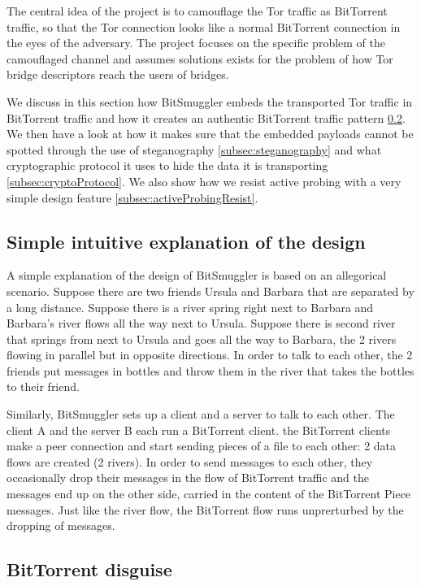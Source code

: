 \documentclass[11pt]{article} %
\newcommand{\projectName}{BitSmuggler }
\begin{document}
The central idea of the project is to camouflage the Tor traffic as BitTorrent traffic, so that the Tor connection looks like a normal BitTorrent connection in the eyes of the adversary. The project focuses on the specific problem of the camouflaged channel and assumes solutions exists for the problem of how Tor bridge descriptors reach the users of bridges.

We discuss in this section how \projectName embeds the transported Tor traffic in BitTorrent traffic and how it creates an authentic BitTorrent traffic pattern  \ref{subsec:btDisguise}. We then have a look at how it makes sure that the embedded payloads cannot be spotted through the use of steganography  \ref{subsec:steganography} and what cryptographic protocol it uses to hide the data it is transporting  \ref{subsec:cryptoProtocol}. We also show how we resist active probing with a very simple design feature 
 \ref{subsec:activeProbingResist}.


\subsection{Simple intuitive explanation of the design}

A simple explanation of the design of \projectName is based on an allegorical scenario. Suppose there are two friends Ursula and Barbara that are separated by a long distance. Suppose there is a river spring right next to Barbara and Barbara's river flows all the way next to Ursula. Suppose there is second river that springs from next to Ursula and goes all the way to Barbara, the 2 rivers flowing in parallel but in opposite directions. In order to talk to each other, the 2 friends put messages in bottles and throw them in the river that takes the bottles to their friend.


Similarly, \projectName sets up a client and a server to talk to each other. The client A and the server B each run a BitTorrent client. the BitTorrent clients make a peer connection and start sending pieces of a file to each other: 2 data flows are created (2 rivers). In order to send messages to each other, they occasionally drop their messages in the flow of BitTorrent traffic and the messages end up on the other side, carried in the content of the BitTorrent Piece messages. Just like the river flow, the BitTorrent flow runs unprerturbed by the dropping of messages.

\subsection{BitTorrent disguise}
\label{subsec:btDisguise}
\end{document}
